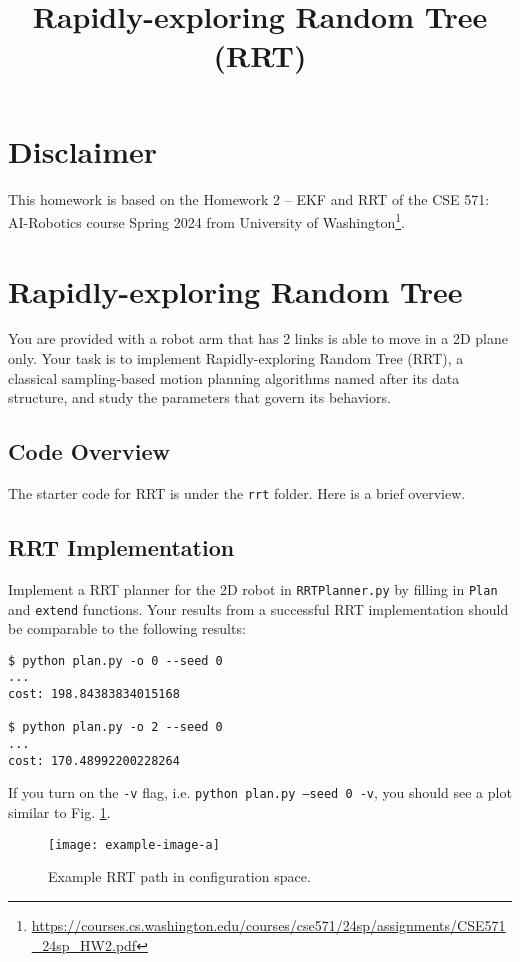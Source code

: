 \documentclass[tp]{lcc}
\title{Rapidly-exploring Random Tree (RRT)}
\author{}
\date{}
\begin{document}
\maketitle

\section{Disclaimer}
This homework is based on the Homework 2 -- EKF and RRT of the CSE 571: AI-Robotics course Spring 2024 from University of Washington\footnote{\url{https://courses.cs.washington.edu/courses/cse571/24sp/assignments/CSE571_24sp_HW2.pdf}}.

\section{Rapidly-exploring Random Tree}
You are provided with a robot arm that has 2 links is able to move in a 2D plane only. Your task is to implement Rapidly-exploring Random Tree (RRT), a classical sampling-based motion planning algorithms named after its data structure, and study the parameters that govern its behaviors.

\subsection{Code Overview}
The starter code for RRT is under the \texttt{rrt} folder. Here is a brief overview.

\subsection{RRT Implementation}
Implement a RRT planner for the 2D robot in \texttt{RRTPlanner.py} by filling in \texttt{Plan} and \texttt{extend} functions. Your results from a successful RRT implementation should be comparable to the following results:

\begin{verbatim}
$ python plan.py -o 0 --seed 0
...
cost: 198.84383834015168

$ python plan.py -o 2 --seed 0
...
cost: 170.48992200228264
\end{verbatim}

If you turn on the \texttt{-v} flag, i.e. \texttt{python plan.py --seed 0 -v}, you should see a plot similar to Fig. \ref{fig:rrt}.

 \begin{figure}[h]
     \centering
     \texttt{[image: example-image-a]}
     \caption{Example RRT path in configuration space.}
     \label{fig:rrt}
 \end{figure}
\end{document}
